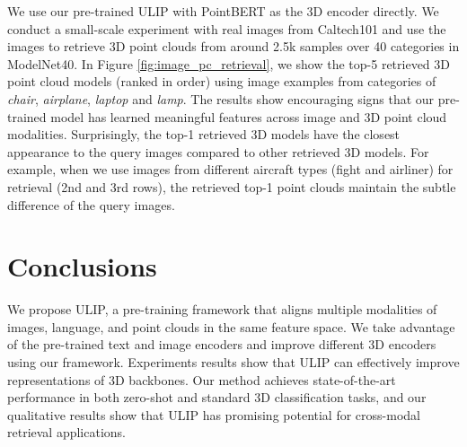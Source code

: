 We use our pre-trained ULIP with PointBERT as the 3D encoder directly. We conduct a small-scale experiment with real images from Caltech101 \cite{fei2004learning} and use the images to retrieve 3D point clouds from around 2.5k samples over 40 categories in ModelNet40. In Figure \ref{fig:image_pc_retrieval}, we show the top-5 retrieved 3D point cloud models (ranked in order) using image examples from categories of \emph{chair}, \emph{airplane}, \emph{laptop} and \emph{lamp}. The results show encouraging signs that our pre-trained model has learned meaningful features across image and 3D point cloud modalities. Surprisingly, the top-1 retrieved 3D models have the closest appearance to the query images compared to other retrieved 3D models. For example, when we use images from different aircraft types (fight and airliner) for retrieval (2nd and 3rd rows), the retrieved top-1 point clouds maintain the subtle difference of the query images.

\section{Conclusions}
\label{sec:conclusion}
We propose ULIP, a pre-training framework that aligns multiple modalities of images, language, and point clouds in the same feature space. We take advantage of the pre-trained text and image encoders and improve different 3D encoders using our framework. Experiments results show that ULIP can effectively improve representations of 3D backbones. Our method achieves state-of-the-art performance in both zero-shot and standard 3D classification tasks, and our qualitative results show that ULIP has promising potential for cross-modal retrieval applications.

{\small
}

\clearpage

